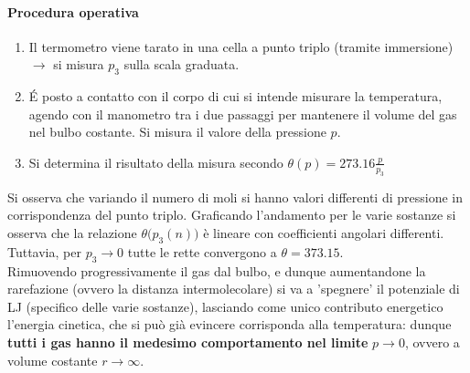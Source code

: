 \documentclass[10pt, oneside]{book}
\begin{document}
\paragraph{Procedura operativa}
\begin{enumerate}
\item Il termometro viene tarato in una cella a punto triplo (tramite immersione) $\rightarrow$ si misura $p_3$ sulla scala graduata.
\item \'E posto a contatto con il corpo di cui si intende misurare la temperatura, agendo con il manometro tra i due passaggi per mantenere il volume del gas nel bulbo costante. Si misura il valore della pressione $p$.
\item Si determina il risultato della misura secondo $\displaystyle \theta(p) = 273.16 \frac{p}{p_3}$
\end{enumerate}
Si osserva che variando il numero di moli si hanno valori differenti di pressione in corrispondenza del punto triplo. Graficando l'andamento per le varie sostanze si osserva che la relazione $\theta\big(p_3(n)\big)$ è lineare con coefficienti angolari differenti. Tuttavia, per $p_3 \rightarrow 0$ tutte le rette convergono a $\theta = 373.15$.
\\Rimuovendo progressivamente il gas dal bulbo, e dunque aumentandone la rarefazione (ovvero la distanza intermolecolare) si va a 'spegnere' il potenziale di LJ (specifico delle varie sostanze), lasciando come unico contributo energetico l'energia cinetica, che si può già evincere corrisponda alla temperatura: dunque \textbf{tutti i gas hanno il medesimo comportamento nel limite} $p 	\rightarrow 0$, ovvero a volume costante $r \rightarrow \infty$.
\end{document}
